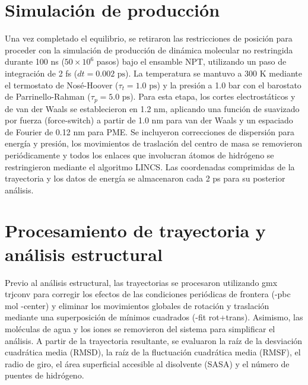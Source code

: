 \section{Simulación de producción}

Una vez completado el equilibrio, se retiraron las restricciones de posición para proceder con la simulación de producción de dinámica molecular no restringida durante 100 ns ($50 \times 10^6$ pasos) bajo el ensamble NPT, utilizando un paso de integración de 2 fs ($dt = 0.002\text{ ps}$). La temperatura se mantuvo a 300 K mediante el termostato de Nosé-Hoover ($\tau_t = 1.0\text{ ps}$) y la presión a 1.0 bar con el barostato de Parrinello-Rahman ($\tau_p = 5.0\text{ ps}$). Para esta etapa, los cortes electrostáticos y de van der Waals se establecieron en 1.2 nm, aplicando una función de suavizado por fuerza (force-switch) a partir de 1.0 nm para van der Waals y un espaciado de Fourier de 0.12 nm para PME. Se incluyeron correcciones de dispersión para energía y presión, los movimientos de traslación del centro de masa se removieron periódicamente y todos los enlaces que involucran átomos de hidrógeno se restringieron mediante el algoritmo LINCS. Las coordenadas comprimidas de la trayectoria y los datos de energía se almacenaron cada 2 ps para su posterior análisis.

\section{Procesamiento de trayectoria y análisis estructural}

Previo al análisis estructural, las trayectorias se procesaron utilizando gmx trjconv para corregir los efectos de las condiciones periódicas de frontera (-pbc mol -center) y eliminar los movimientos globales de rotación y traslación mediante una superposición de mínimos cuadrados (-fit rot+trans). Asimismo, las moléculas de agua y los iones se removieron del sistema para simplificar el análisis. A partir de la trayectoria resultante, se evaluaron la raíz de la desviación cuadrática media (RMSD), la raíz de la fluctuación cuadrática media (RMSF), el radio de giro, el área superficial accesible al disolvente (SASA) y el número de puentes de hidrógeno. 








